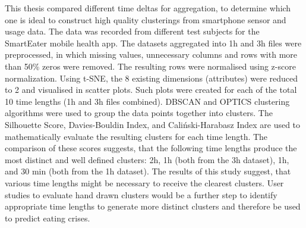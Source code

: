 This thesis compared different time deltas for aggregation, to determine which one is ideal to construct high quality clusterings from smartphone sensor and usage data. The data was recorded from different test subjects for the SmartEater mobile health app. The datasets aggregated into 1h and 3h files were preprocessed, in which missing values, unnecessary columns and rows with more than 50\% zeros were removed. The resulting rows were normalised using z-score normalization. Using t-SNE, the 8 existing dimensions (attributes) were reduced to 2 and visualised in scatter plots. Such plots were created for each of the total 10 time lengths (1h and 3h files combined). DBSCAN and OPTICS clustering algorithms were used to group the data points together into clusters. The Silhouette Score, Davies-Bouldin Index, and Caliński-Harabasz Index are used to mathematically evaluate the resulting clusters for each time length. The comparison of these scores suggests, that the following time lengths produce the most distinct and well defined clusters: 2h, 1h (both from the 3h dataset), 1h, and 30 min (both from the 1h dataset). The results of this study suggest, that various time lengths might be necessary to receive the clearest clusters. User studies to evaluate hand drawn clusters would be a further step to identify appropriate time lengths to generate more distinct clusters and therefore be used to predict eating crises.
